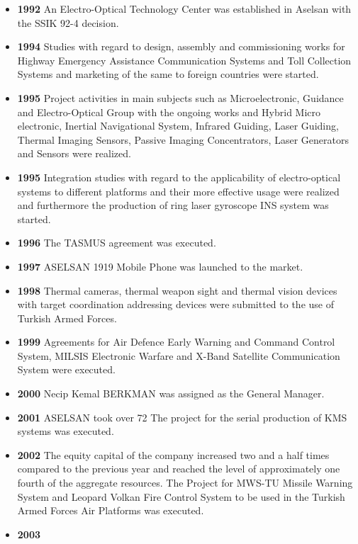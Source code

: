 \begin{itemize}
\item \textbf{ 1992 }
\subitem An Electro-Optical Technology Center was established in Aselsan with the SSIK 92-4 decision.
\item \textbf{ 1994 }
\subitem Studies with regard to design, assembly and commissioning works for Highway Emergency Assistance Communication Systems and Toll Collection Systems and marketing of the same to foreign countries were started.
\item \textbf{ 1995 }
\subitem Project activities in main subjects such as Microelectronic, Guidance and Electro-Optical Group with the ongoing works and Hybrid Micro electronic, Inertial Navigational System, Infrared Guiding, Laser Guiding, Thermal Imaging Sensors, Passive Imaging Concentrators, Laser Generators and Sensors were realized.
\item \textbf{ 1995 }
\subitem Integration studies with regard to the applicability of electro-optical systems to different platforms and their more effective usage were realized and furthermore the production of ring laser gyroscope INS system was started.
\item \textbf{ 1996 }
\subitem The TASMUS agreement was executed.
\item \textbf{ 1997 }
\subitem ASELSAN 1919 Mobile Phone was launched to the market.
\item \textbf{ 1998 }
\subitem Thermal cameras, thermal weapon sight and thermal vision devices with target coordination addressing devices were submitted to the use of Turkish Armed Forces.
\item \textbf{ 1999 }
\subitem Agreements for Air Defence Early Warning and Command Control System, MILSIS Electronic Warfare and X-Band Satellite Communication System were executed.
\item \textbf{ 2000 }
\subitem Necip Kemal BERKMAN was assigned as the General Manager.
\item \textbf{ 2001 }
\subitem ASELSAN took over 72%
\subitem The project for the serial production of KMS systems was executed. 
\item \textbf{ 2002 }
\subitem The equity capital of the company increased two and a half times compared to the previous year and reached the level of approximately one fourth of the aggregate resources.
\subitem The Project for MWS-TU Missile Warning System and Leopard Volkan Fire Control System to be used in the Turkish Armed Forces Air Platforms was executed.
\item \textbf{ 2003 }

\end{itemize}
